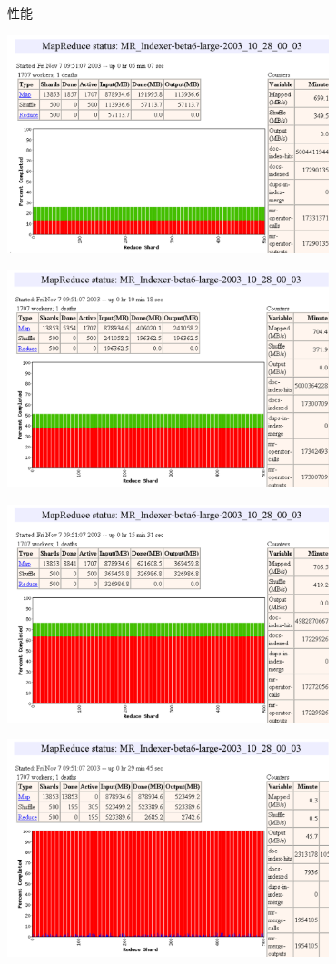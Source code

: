 \documentclass{beamer}
\begin{document}
\begin{frame}{性能}
\begin{overprint}
    \centerline{\includegraphics[height=180pt]{keyan/p1.png} }
    \centerline{\includegraphics[height=180pt]{keyan/p2.png} }
    \centerline{\includegraphics[height=180pt]{keyan/p3.png} }
    \centerline{\includegraphics[height=180pt]{keyan/p4.png} }

\end{overprint}
\end{frame}
\end{document}
